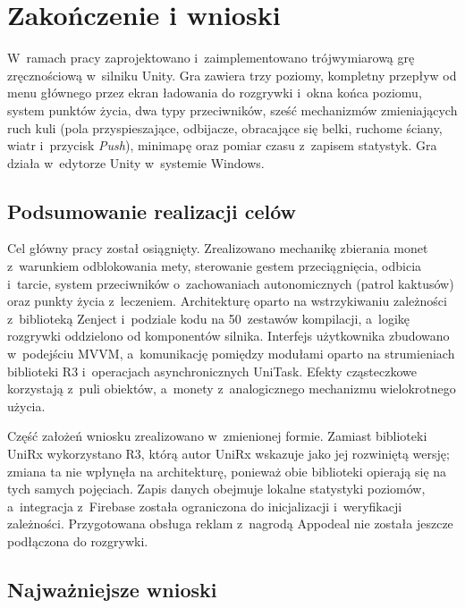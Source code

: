 \chapter{Zakończenie i wnioski}
\label{rozdz:zakonczenie}

W~ramach pracy zaprojektowano i~zaimplementowano trójwymiarową grę zręcznościową
w~silniku Unity. Gra zawiera trzy poziomy, kompletny przepływ od menu
głównego przez ekran ładowania do rozgrywki i~okna końca poziomu, system punktów życia,
dwa typy przeciwników, sześć mechanizmów zmieniających ruch kuli (pola przyspieszające,
odbijacze, obracające się belki, ruchome ściany, wiatr i~przycisk \emph{Push}), minimapę
oraz pomiar czasu z~zapisem statystyk. Gra działa w~edytorze Unity w~systemie Windows.

\section{Podsumowanie realizacji celów}

Cel główny pracy został osiągnięty. Zrealizowano mechanikę zbierania monet
z~warunkiem odblokowania mety, sterowanie gestem przeciągnięcia, odbicia i~tarcie, system
przeciwników o~zachowaniach autonomicznych (patrol kaktusów) oraz punkty życia z~leczeniem.
Architekturę oparto na wstrzykiwaniu zależności z~biblioteką Zenject i~podziale kodu na
50~zestawów kompilacji, a~logikę rozgrywki oddzielono od komponentów silnika. Interfejs
użytkownika zbudowano w~podejściu MVVM, a~komunikację pomiędzy modułami oparto na
strumieniach biblioteki R3 i~operacjach asynchronicznych UniTask. Efekty cząsteczkowe
korzystają z~puli obiektów, a~monety z~analogicznego mechanizmu wielokrotnego użycia.

Część założeń wniosku zrealizowano w~zmienionej formie. Zamiast biblioteki UniRx
wykorzystano R3, którą autor UniRx wskazuje jako jej rozwiniętą wersję; zmiana ta nie
wpłynęła na architekturę, ponieważ obie biblioteki opierają się na tych samych pojęciach.
Zapis danych obejmuje lokalne statystyki poziomów, a~integracja z~Firebase została
ograniczona do inicjalizacji i~weryfikacji zależności. Przygotowana obsługa reklam
z~nagrodą Appodeal nie została jeszcze podłączona do rozgrywki.

\section{Najważniejsze wnioski}

